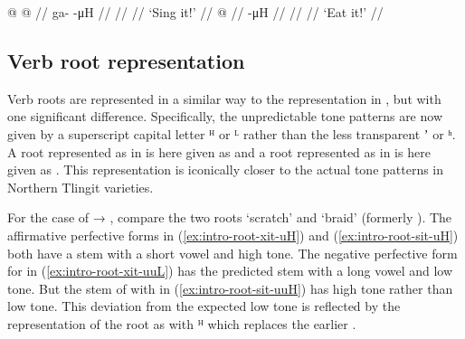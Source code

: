\pex\label{ex:intro-null-morphemes-imp}%
\a\label{ex:intro-null-morphemes-imp-sing}%
\begingl
	\gla	{} @ {} @ {} //
	\glb	ga-  -μH //
	\glc	{}\·  \· //
	\gld	{} {} {} //
	\glft	‘Sing it!’
		//
\endgl
\a\label{ex:intro-null-morphemes-imp-eat}%
\begingl
	\gla	{} @ {} //
	\glb	{} -μH //
	\glc	{} \· //
	\gld	{} {} {} //
	\glft	‘Eat it!’
		//
\endgl
\xe

\subsection{Verb root representation}\label{sec:intro-root}

Verb roots are represented in a similar way to the representation in \cite{crippen:2019}, but with one significant difference.
Specifically, the unpredictable tone patterns are now given by a superscript capital letter ᴴ or ᴸ rather than the less transparent ʼ or ʰ.
A root represented as  in \cite{crippen:2019} is here given as  and a root represented as  in \cite{crippen:2019} is here given as .
This representation is iconically closer to the actual tone patterns in Northern Tlingit varieties.

For the case of  → , compare the two roots  ‘scratch’ and  ‘braid’ (formerly ).
The affirmative perfective forms in (\ref{ex:intro-root-xit-uH}) and (\ref{ex:intro-root-sit-uH}) both have a  stem with a short vowel and high tone.
The negative perfective form for  in (\ref{ex:intro-root-xit-uuL}) has the predicted  stem with a long vowel and low tone.
But the stem of  with  in (\ref{ex:intro-root-sit-uuH}) has high tone rather than low tone.
This deviation from the expected low tone is reflected by the representation of the root as  with ᴴ which replaces the earlier .

